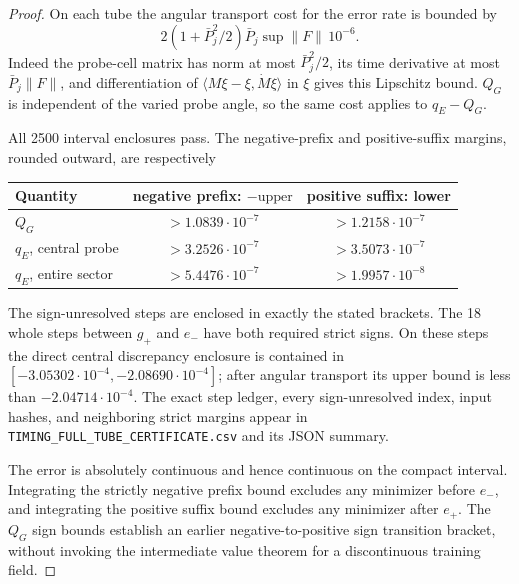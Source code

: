 \begin{proof}
On each tube the angular transport cost for the error rate is bounded by
\[
 2(1+\bar P_j^2/2)\bar P_j\sup\|F\|\,10^{-6}.
\]
Indeed the probe-cell matrix has norm at most $\bar P_j^2/2$, its time
derivative at most $\bar P_j\|F\|$, and differentiation of
$\langle M\xi-\xi,\dot M\xi\rangle$ in $\xi$ gives this Lipschitz bound.
$Q_G$ is independent of the varied probe angle, so the same cost applies
to $q_E-Q_G$.

All 2500 interval enclosures pass. The negative-prefix and positive-suffix
margins, rounded outward, are respectively
\begin{center}
\begin{tabular}{lcc}
\toprule
Quantity & negative prefix: $-\text{upper}$ & positive suffix: lower\\
\midrule
$Q_G$ & $>1.0839\cdot10^{-7}$ & $>1.2158\cdot10^{-7}$\\
$q_E$, central probe & $>3.2526\cdot10^{-7}$ & $>3.5073\cdot10^{-7}$\\
$q_E$, entire sector & $>5.4476\cdot10^{-7}$ & $>1.9957\cdot10^{-8}$\\
\bottomrule
\end{tabular}
\end{center}
The sign-unresolved steps are enclosed in exactly the stated brackets.
The 18 whole steps between $g_+$ and $e_-$ have both required strict signs.
On these steps the direct central discrepancy enclosure is contained in
$[-3.05302\cdot10^{-4},-2.08690\cdot10^{-4}]$; after angular transport its
upper bound is less than $-2.04714\cdot10^{-4}$.
The exact step ledger, every sign-unresolved index, input hashes, and
neighboring strict margins appear in
\texttt{TIMING\_FULL\_TUBE\_CERTIFICATE.csv} and its JSON summary.

The error is absolutely continuous and hence continuous on the compact
interval. Integrating the strictly negative prefix bound excludes any
minimizer before $e_-$, and integrating the positive suffix bound excludes
any minimizer after $e_+$. The $Q_G$ sign bounds establish an earlier
negative-to-positive sign transition bracket, without invoking the
intermediate value theorem for a discontinuous training field.
\end{proof}

